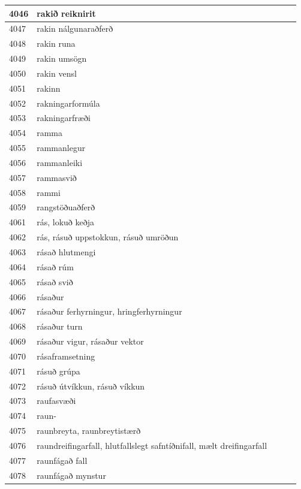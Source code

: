 \begin{longtable}{p{}|p{}|p{}|p{}|p{}}
\hline
4046 & rakið reiknirit &  &  &  \\
\hline
4047 & rakin nálgunaraðferð &  &  &  \\
\hline
4048 & rakin runa &  &  &  \\
\hline
4049 & rakin umsögn &  &  &  \\
\hline
4050 & rakin vensl &  &  &  \\
\hline
4051 & rakinn &  &  &  \\
\hline
4052 & rakningarformúla &  &  &  \\
\hline
4053 & rakningarfræði &  &  &  \\
\hline
4054 & ramma &  &  &  \\
\hline
4055 & rammanlegur &  &  &  \\
\hline
4056 & rammanleiki &  &  &  \\
\hline
4057 & rammasvið &  &  &  \\
\hline
4058 & rammi &  &  &  \\
\hline
4059 & rangstöðuaðferð &  &  &  \\
\hline
4061 & rás, lokuð keðja &  &  &  \\
\hline
4062 & rás, rásuð uppstokkun, rásuð umröðun &  &  &  \\
\hline
4063 & rásað hlutmengi &  &  &  \\
\hline
4064 & rásað rúm &  &  &  \\
\hline
4065 & rásað svið &  &  &  \\
\hline
4066 & rásaður &  &  &  \\
\hline
4067 & rásaður ferhyrningur, hringferhyrningur &  &  &  \\
\hline
4068 & rásaður turn &  &  &  \\
\hline
4069 & rásaður vigur, rásaður vektor &  &  &  \\
\hline
4070 & rásaframsetning &  &  &  \\
\hline
4071 & rásuð grúpa &  &  &  \\
\hline
4072 & rásuð útvíkkun, rásuð víkkun &  &  &  \\
\hline
4073 & raufasvæði &  &  &  \\
\hline
4074 & raun- &  &  &  \\
\hline
4075 & raunbreyta, raunbreytistærð &  &  &  \\
\hline
4076 & raundreifingarfall, hlutfallslegt safntíðnifall, mælt dreifingarfall &  &  &  \\
\hline
4077 & raunfágað fall &  &  &  \\
\hline
4078 & raunfágað mynstur &  &  &  \\

\end{longtable}
